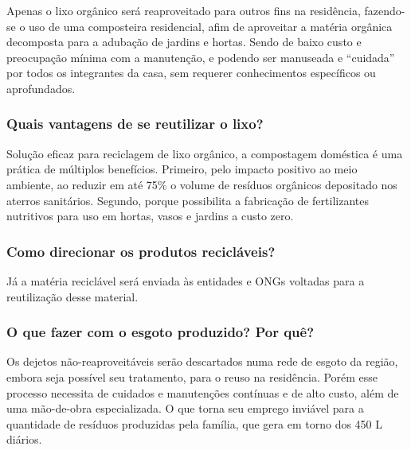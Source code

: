 	Apenas o lixo orgânico será reaproveitado para outros fins na residência, fazendo-se o uso de uma composteira residencial, afim de aproveitar a matéria orgânica decomposta para a adubação de jardins e hortas. Sendo de baixo custo e preocupação mínima com a manutenção, e podendo ser manuseada e “cuidada” por todos os integrantes da casa, sem requerer conhecimentos específicos ou aprofundados. 

\subsubsection{Quais vantagens de se reutilizar o lixo?}

	Solução eficaz para reciclagem de lixo orgânico, a compostagem doméstica é uma prática de múltiplos benefícios. Primeiro, pelo impacto positivo ao meio ambiente, ao reduzir em até 75\% o volume de resíduos orgânicos depositado nos aterros sanitários. Segundo, porque possibilita a fabricação de fertilizantes nutritivos para uso em hortas, vasos e jardins a custo zero.

\subsubsection{Como direcionar os produtos recicláveis?}

	Já a matéria reciclável será enviada às entidades e ONGs voltadas para a reutilização desse material.

\subsubsection{O que fazer com o esgoto produzido? Por quê?}

	Os dejetos não-reaproveitáveis serão descartados numa rede de esgoto da região, embora seja possível seu tratamento, para o reuso na residência. Porém esse processo necessita de cuidados e manutenções contínuas e de alto custo, além de uma mão-de-obra especializada. O que torna seu emprego inviável para a quantidade de resíduos produzidas pela família, que gera em torno dos 450 L diários.\cite{estimativaNBR7229}\cite{ecycle}
